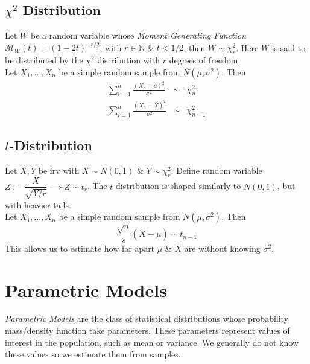 \documentclass[11pt,a4paper]{article}
\begin{document}
\subsection{$\chi^2$ Distribution}

Let $W$ be a random variable whose \textit{Moment Generating Function} $\mathcal{M}_W(t)=(1-2t)^{-r/2}$, with $r\in\mathbb{N}$ \& $t<1/2$, then $W\sim\chi^2_r$. Here $W$ is said to be distributed by the $\chi^2$ distribution with $r$ degrees of freedom.\\

Let $X_1,\dots,X_n$ be a simple random sample from $N(\mu,\sigma^2)$. Then
\[\begin{array}{rcl}
\displaystyle{\sum_{i=1}^n\frac{(X_n-\mu)^2}{\sigma^2}}&\sim&\chi_n^2\\
\displaystyle{\sum_{i=1}^n\frac{(X_n-\overline{X})^2}{\sigma^2}}&\sim&\chi_{n-1}^2
\end{array}\]

\subsection{$t$-Distribution}

Let $X, Y$ be irv with $X\sim N(0,1)$ \& $Y\sim\chi_r^2$. Define random variable $Z:=\dfrac{X}{\sqrt{Y/r}}\implies Z\sim t_r$. The $t$-distribution is shaped similarly to $N(0,1)$, but with heavier tails.\\

Let $X_1,\dots,X_n$ be a simple random sample from $N(\mu,\sigma^2)$. Then
$$\frac{\sqrt{n}}{s}(\overline{X}-\mu)\sim t_{n-1}$$
This allows us to estimate how far apart $\mu$ \& $\overline{X}$ are without knowing $\sigma^2$.

\section{Parametric Models}

\textit{Parametric Models} are the class of statistical distributions whose probability mass/density function take parameters. These parameters represent values of interest in the population, such as mean or variance. We generally do not know these values so we estimate them from samples.\\
\end{document}
